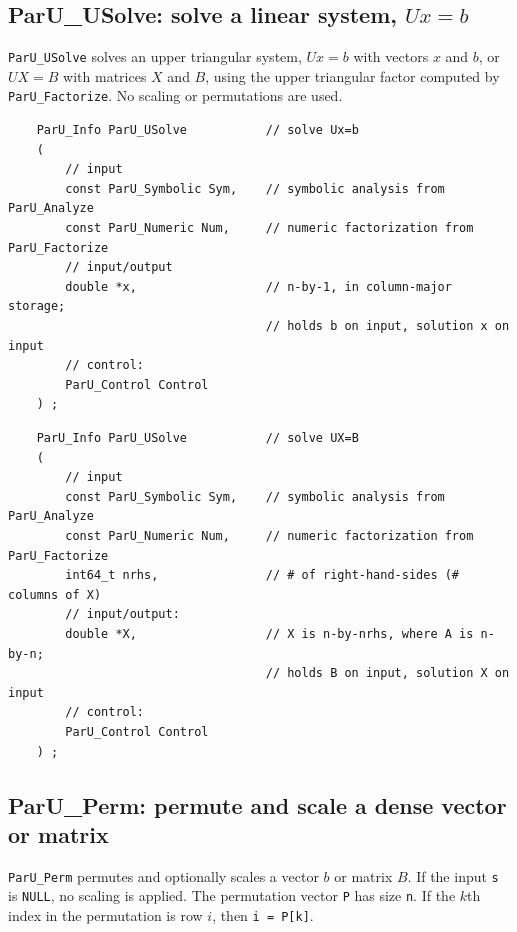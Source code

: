 \documentclass[12pt]{article}
\begin{document}
\subsection{{\sf ParU\_USolve}: solve a linear system, $Ux=b$}

    \verb'ParU_USolve' solves an upper triangular system, $Ux=b$ with vectors
    $x$ and $b$, or $UX=B$ with matrices $X$ and $B$, using the upper
    triangular factor computed by \verb'ParU_Factorize'.  No scaling or
    permutations are used.

    {\footnotesize
    \begin{verbatim}
    ParU_Info ParU_USolve           // solve Ux=b
    (
        // input
        const ParU_Symbolic Sym,    // symbolic analysis from ParU_Analyze
        const ParU_Numeric Num,     // numeric factorization from ParU_Factorize
        // input/output
        double *x,                  // n-by-1, in column-major storage;
                                    // holds b on input, solution x on input
        // control:
        ParU_Control Control
    ) ; \end{verbatim} }

    {\footnotesize
    \begin{verbatim}
    ParU_Info ParU_USolve           // solve UX=B
    (
        // input
        const ParU_Symbolic Sym,    // symbolic analysis from ParU_Analyze
        const ParU_Numeric Num,     // numeric factorization from ParU_Factorize
        int64_t nrhs,               // # of right-hand-sides (# columns of X)
        // input/output:
        double *X,                  // X is n-by-nrhs, where A is n-by-n;
                                    // holds B on input, solution X on input
        // control:
        ParU_Control Control
    ) ; \end{verbatim} }

\subsection{{\sf ParU\_Perm}: permute and scale a dense vector or matrix}
\label{perm}

    \verb'ParU_Perm' permutes and optionally scales a vector $b$ or matrix $B$.
    If the input \verb's' is \verb'NULL', no scaling is applied.  The
    permutation vector \verb'P' has size \verb'n'.  If the $k$th index in the
    permutation is row $i$, then \verb'i = P[k]'.
\end{document}
